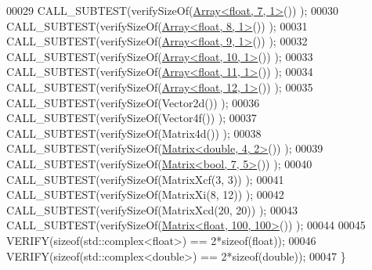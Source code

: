 \begin{DoxyCode}
00029   CALL\_SUBTEST(verifySizeOf(\hyperlink{group___core___module_class_eigen_1_1_array}{Array<float, 7, 1>}()) );
00030   CALL\_SUBTEST(verifySizeOf(\hyperlink{group___core___module_class_eigen_1_1_array}{Array<float, 8, 1>}()) );
00031   CALL\_SUBTEST(verifySizeOf(\hyperlink{group___core___module_class_eigen_1_1_array}{Array<float, 9, 1>}()) );
00032   CALL\_SUBTEST(verifySizeOf(\hyperlink{group___core___module_class_eigen_1_1_array}{Array<float, 10, 1>}()) );
00033   CALL\_SUBTEST(verifySizeOf(\hyperlink{group___core___module_class_eigen_1_1_array}{Array<float, 11, 1>}()) );
00034   CALL\_SUBTEST(verifySizeOf(\hyperlink{group___core___module_class_eigen_1_1_array}{Array<float, 12, 1>}()) );
00035   CALL\_SUBTEST(verifySizeOf(Vector2d()) );
00036   CALL\_SUBTEST(verifySizeOf(Vector4f()) );
00037   CALL\_SUBTEST(verifySizeOf(Matrix4d()) );
00038   CALL\_SUBTEST(verifySizeOf(\hyperlink{group___core___module_class_eigen_1_1_matrix}{Matrix<double, 4, 2>}()) );
00039   CALL\_SUBTEST(verifySizeOf(\hyperlink{group___core___module_class_eigen_1_1_matrix}{Matrix<bool, 7, 5>}()) );
00040   CALL\_SUBTEST(verifySizeOf(MatrixXcf(3, 3)) );
00041   CALL\_SUBTEST(verifySizeOf(MatrixXi(8, 12)) );
00042   CALL\_SUBTEST(verifySizeOf(MatrixXcd(20, 20)) );
00043   CALL\_SUBTEST(verifySizeOf(\hyperlink{group___core___module_class_eigen_1_1_matrix}{Matrix<float, 100, 100>}()) );
00044   
00045   VERIFY(\textcolor{keyword}{sizeof}(std::complex<float>) == 2*\textcolor{keyword}{sizeof}(\textcolor{keywordtype}{float}));
00046   VERIFY(\textcolor{keyword}{sizeof}(std::complex<double>) == 2*\textcolor{keyword}{sizeof}(\textcolor{keywordtype}{double}));
00047 \}
\end{DoxyCode}
